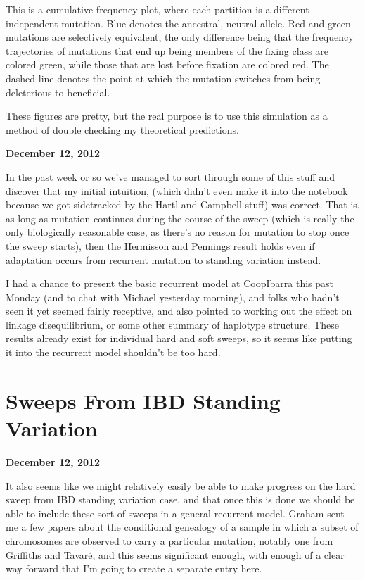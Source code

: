 \documentclass[reqno]{amsart}
\begin{document}
This is a cumulative frequency plot, where each partition is a different independent mutation. Blue denotes the ancestral, neutral allele. Red and green mutations are selectively equivalent, the only difference being that the frequency trajectories of mutations that end up being members of the fixing class are colored green, while those that are lost before fixation are colored red. The dashed line denotes the point at which the mutation switches from being deleterious to beneficial.

These figures are pretty, but the real purpose is to use this simulation as a method of double checking my theoretical predictions.
\begin{flushright}
	\textbf{December 12, 2012}
\end{flushright}
In the past week or so we've managed to sort through some of this stuff and discover that my initial intuition, (which didn't even make it into the notebook because we got sidetracked by the Hartl and Campbell stuff) was correct. That is, as long as mutation continues during the course of the sweep (which is really the only biologically reasonable case, as there's no reason for mutation to stop once the sweep starts), then the Hermisson and Pennings result holds even if adaptation occurs from recurrent mutation to standing variation instead.

I had a chance to present the basic recurrent model at CoopIbarra this past Monday (and to chat with Michael yesterday morning), and folks who hadn't seen it yet seemed fairly receptive, and also pointed to working out the effect on linkage disequilibrium, or some other summary of haplotype structure. These results already exist for individual hard\cite{Stephan2006, McVean2007, Pfaffelhuber2008} and soft\cite{Pokalyuk2012} sweeps, so it seems like putting it into the recurrent model shouldn't be too hard.

\section*{Sweeps From IBD Standing Variation} 
\begin{flushright}
	\textbf{December 12, 2012}
\end{flushright}

It also seems like we might relatively easily be able to make progress on the hard sweep from IBD standing variation case, and that once this is done we should be able to include these sort of sweeps in a general recurrent model. Graham sent me a few papers about the conditional genealogy of a sample in which a subset of chromosomes are observed to carry a particular mutation, notably one from Griffiths and Tavar{\'e}\cite{GriffithsTavare:2003}, and this seems significant enough, with enough of a clear way forward that I'm going to create a separate entry here.
\end{document}
